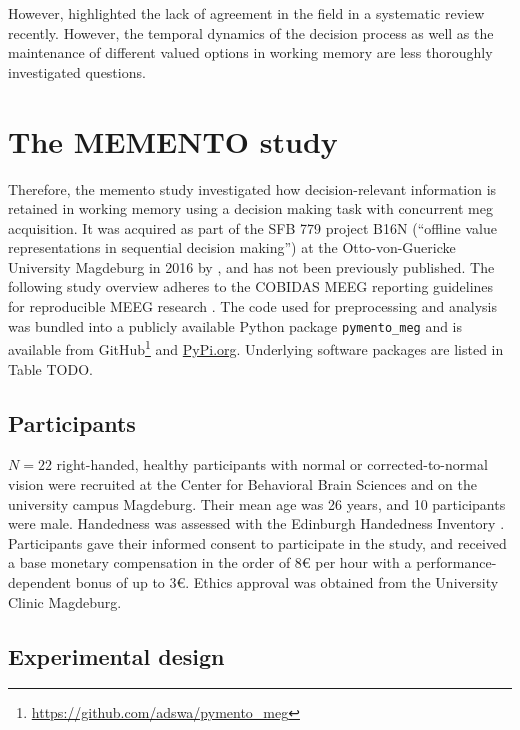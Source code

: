 However, \citet{pavlov2022oscillatory} highlighted the lack of agreement in the field in a systematic review recently.
However, the temporal dynamics of the decision process as well as the maintenance of different valued options in working memory are less thoroughly investigated questions.


\section{The MEMENTO study}


Therefore, the memento study investigated how decision-relevant information is retained in working memory using a decision making task with concurrent \gls{meg} acquisition.
It was acquired as part of the SFB 779 project B16N (``offline value representations in sequential decision making'') at the Otto-von-Guericke University Magdeburg in 2016 by \citet{kaiser}, and has not been previously published.
The following study overview adheres to the COBIDAS MEEG reporting guidelines for reproducible MEEG research \citep{pernet2020issues}.
The code used for preprocessing and analysis was bundled into a publicly available Python package \texttt{pymento\_meg} and is available from GitHub\footnote{\url{https://github.com/adswa/pymento_meg}} and \url{PyPi.org}.
Underlying software packages are listed in Table TODO.

\subsection{Participants}

$N = 22$ right-handed, healthy participants with normal or corrected-to-normal vision were recruited at the Center for Behavioral Brain Sciences and on the university campus Magdeburg.
Their mean age was 26 years, and 10 participants were male.
Handedness was assessed with the Edinburgh Handedness Inventory \citep{oldfield1971assessment}.
Participants gave their informed consent to participate in the study, and received a base monetary compensation in the order of 8€ per hour with a performance-dependent bonus of up to 3€.
Ethics approval was obtained from the University Clinic Magdeburg.

\subsection{Experimental design}

